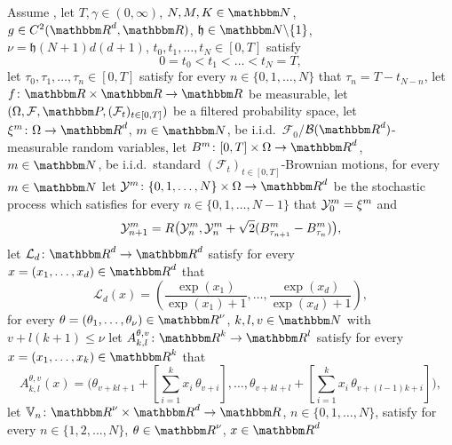 \begin{algo}
	\label{algo:special_case}
	Assume ,
	let
	$T,\gamma\in (0,\infty)$,
	$N,M,K \in\N$, 
	$g \in C^2(\R^d,\R)$,
	$\mathfrak{h} \in \N \backslash \{1\}$,
	$\nu = \mathfrak{h}(N+1)d(d+1)$,
	$t_0,t_1,\ldots,t_N\in [0,T]$ satisfy
	\begin{equation}
	0 = t_0 < t_1 < \ldots < t_N = T,
	\end{equation}
	let $\tau_0, \tau_1, \dots,\tau_n \in [0,T]$ satisfy for every 
	$n \in \{0,1,\dots,N\}$ that $\tau_n= T-t_{N-n}$,
	let
	$
	f \colon \R \times \R \to \R
	$
	be measurable,
	let
	$(\Omega,\F,\P,(\mathcal{F}_t)_{t\in [0,T]})$
	be a filtered probability space,
	let
	$\xi^{m}\colon\Omega\to\R^d$,
	$m\in\N$,
	be i.i.d.\ $\mathcal{F}_0$/$\B(\R^d)$-measurable random variables,
	let
	$B^{m}\colon [0,T]\times \Omega \to\R^d$,
	$m\in\N$, be i.i.d.~standard
	$(\mathcal{F}_t)_{t\in [0,T]}$-Brownian motions,
	for every
	$m\in\N$
	let
	$\Y^{m}\colon \{0,1,\ldots,N\}\times\Omega\to\R^d$
	be the stochastic process which satisfies for every $n\in\{0,1,\ldots,N-1\}$   that
	${\mathcal{Y}}^{m}_0 = \xi^{m}$ and
	\begin{equation}\label{Y-algo-spez}
	{\ensuremath{\mathcal{Y}}}^{m}_{n+1}
	=
	R\big({\mathcal{Y}}^{m}_{n}, {\mathcal{Y}}^{m}_{n} + \sqrt{2} (B^{m}_{\tau_{n+1}}-B^{m}_{\tau_{n}})\big),
	\end{equation}
	let 
	$ \mathcal{L}_d \colon \R^d \to \R^d $ 
	satisfy for every 
	$ x = ( x_1, \dots, x_d ) \in \R^d $ 
	that
	\begin{equation}
	\label{eq:activation}
	\mathcal{L}_d( x )
	=
	\left(
	\frac{\exp(x_1)}{\exp(x_1)+1},
	\dots
	,
	\frac{\exp(x_d)}{\exp(x_d)+1}
	\right)
	,
	\end{equation}
	for every $ \theta = ( \theta_1, \dots, \theta_{ \nu } ) \in \R^{ \nu }$,
	$k, l, v \in \N $
	with
	$
	v + l (k + 1 ) \leq \nu
	$
	let
	$ A^{ \theta, v }_{ k, l } \colon \R^k \to \R^l $
	satisfy for every
	$ x = ( x_1, \dots, x_k )\in\R^k $ that
	\begin{equation}\label{eq:layerA}
	A^{ \theta, v }_{ k, l }( x ) = \bigg(\theta_{v+kl+1}+ \left[\textstyle\sum\limits_{i=1}^ k x_i\, \theta_{v+i}\right], \dots, \theta_{v+kl+l} + \left[\textstyle\sum\limits_{i=1}^ k x_i\, \theta_{v+(l-1)k+i}\right] \bigg),
	\end{equation}
	let
	$\bV_n\colon\R^{\nu}\times\R^d\to\R$, $n\in\{0,1,\ldots,N\}$,
	satisfy for every
	$n\in\{1,2,\ldots,N\}$, $\theta \in \R^\nu$, $x \in \R^d$

\end{algo}
